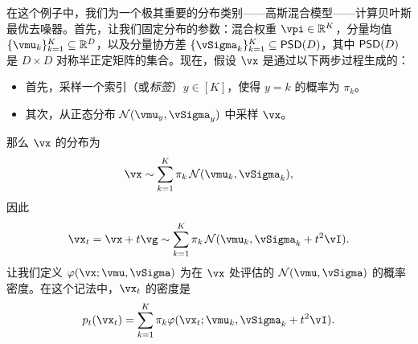 \documentclass[../../book-main_zh.tex]{subfiles}
\begin{document}
\begin{example}[从高斯混合模型中去噪高斯噪声]\label{example:denoising_gaussian_mixture}
	在这个例子中，我们为一个极其重要的分布类别——高斯混合模型——计算贝叶斯最优去噪器。首先，让我们固定分布的参数：混合权重 \(\vpi \in \R^{K}\)，分量均值 \(\{\vmu_{k}\}_{k = 1}^{K} \subseteq \R^{D}\)，以及分量协方差 \(\{\vSigma_{k}\}_{k = 1}^{K} \subseteq \PSD(D)\)，其中 \(\mathsf{PSD}(D)\) 是 \(D \times D\) 对称半正定矩阵的集合。现在，假设 \(\vx\) 是通过以下两步过程生成的：
	\begin{itemize}
		\item 首先，采样一个索引（或\textit{标签}）\(y \in [K]\)，使得 \(y = k\) 的概率为 \(\pi_{k}\)。
		\item 其次，从正态分布 \(\dNorm(\vmu_{y}, \vSigma_{y})\) 中采样 \(\vx\)。
	\end{itemize}
	那么 \(\vx\) 的分布为
	\begin{equation}
		\vx \sim \sum_{k = 1}^{K}\pi_{k}\dNorm(\vmu_{k}, \vSigma_{k}),
	\end{equation}
	因此
	\begin{equation}
		\vx_{t} = \vx + t\vg \sim \sum_{k = 1}^{K}\pi_{k}\dNorm(\vmu_{k}, \vSigma_{k} + t^{2}\vI).
	\end{equation}
	让我们定义 \(\phi(\vx ; \vmu, \vSigma)\) 为在 \(\vx\) 处评估的 \(\dNorm(\vmu, \vSigma)\) 的概率密度。在这个记法中，\(\vx_{t}\) 的密度是
	\begin{equation}
		p_{t}(\vx_{t}) = \sum_{k = 1}^{K}\pi_{k}\phi(\vx_{t} ; \vmu_{k}, \vSigma_{k} + t^{2}\vI).
	\end{equation}


\end{example}
\end{document}
